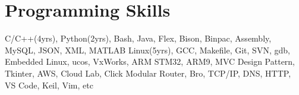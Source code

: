 
\section{Programming Skills}
  \subHeadingListStart
      {C/C++(4yrs), Python(2yrs), Bash, Java, Flex, Bison, Binpac, Assembly, MySQL, JSON, XML, MATLAB}
      {Linux(5yrs), GCC, Makefile, Git, SVN, gdb, Embedded Linux, ucos, VxWorks, ARM STM32, ARM9, MVC Design Pattern, Tkinter, AWS, Cloud Lab, Click Modular Router, Bro, TCP/IP, DNS, HTTP, VS Code, Keil, Vim, etc}
  \subHeadingListEnd

